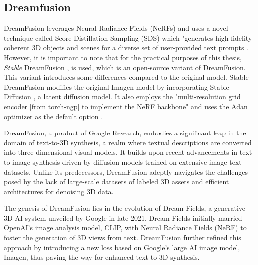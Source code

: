 \subsection{Dreamfusion}
\label{dreamfusion}

DreamFusion leverages Neural Radiance Fields (NeRFs) \citep{mildenhallNERF} and uses a novel technique called Score Distillation Sampling (SDS) \citep{pooleDreamfusion} which "generates high-fidelity coherent 3D objects and scenes for a diverse set of user-provided text prompts \citep{pooleDreamfusion}. However, it is important to note that for the practical purposes of this thesis, \emph{Stable} DreamFusion \citep{stable-dreamfusion}, is used,  which is an open-source variant of DreamFusion. This variant introduces some differences compared to the original model. Stable DreamFusion modifies the original Imagen model by incorporating Stable Diffusion \citep{rombachStableDiffusion}, a latent diffusion model. It also employs the "multi-resolution grid encoder [from torch-ngp] to implement the NeRF backbone" \citep{stable-dreamfusion} and uses the Adan optimizer as the default option \citep{stable-dreamfusion}.

DreamFusion, a product of Google Research, embodies a significant leap in the domain of text-to-3D synthesis, a realm where textual descriptions are converted into three-dimensional visual models. It builds upon recent advancements in text-to-image synthesis driven by diffusion models trained on extensive image-text datasets. Unlike its predecessors, DreamFusion adeptly navigates the challenges posed by the lack of large-scale datasets of labeled 3D assets and efficient architectures for denoising 3D data. 

The genesis of DreamFusion lies in the evolution of Dream Fields, a generative 3D AI system unveiled by Google in late 2021. Dream Fields initially married OpenAI's image analysis model, CLIP, with Neural Radiance Fields (NeRF) to foster the generation of 3D views from text. DreamFusion further refined this approach by introducing a new loss based on Google's large AI image model, Imagen, thus paving the way for enhanced text to 3D synthesis.



